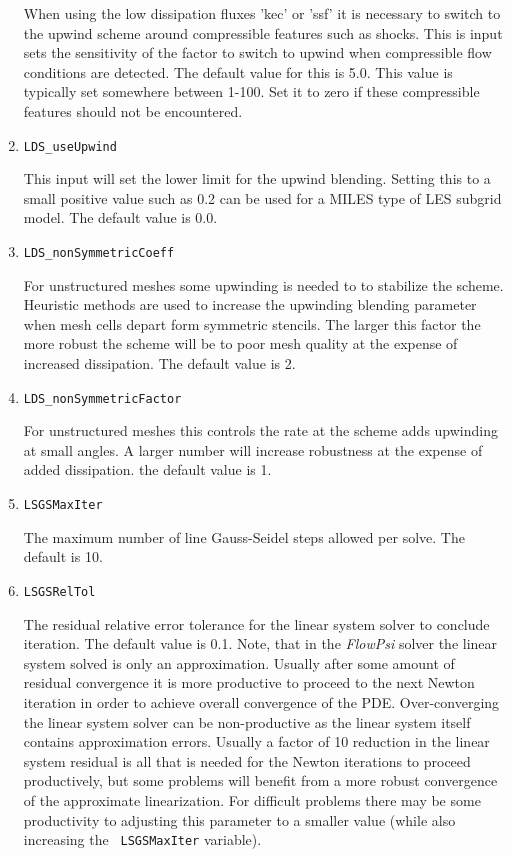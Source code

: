 \documentclass{article}
\begin{document}
\begin{enumerate}
  When using the low dissipation fluxes 'kec' or 'ssf' it is necessary
  to switch to the upwind scheme around compressible features such as
  shocks.  This is input sets the sensitivity of the factor to switch
  to upwind when compressible flow conditions are detected.  The
  default value for this is 5.0.  This value is typically set
  somewhere between 1-100.  Set it to zero if these compressible
  features should not be encountered.

\item {\tt LDS\_useUpwind}

  This input will set the lower limit for the upwind blending.
  Setting this to a small positive value such as 0.2 can be used for a
  MILES type of LES subgrid model.  The default value is 0.0.

\item {\tt LDS\_nonSymmetricCoeff}

  For unstructured meshes some upwinding is needed to to stabilize the
  scheme.  Heuristic methods are used to increase the upwinding
  blending parameter when mesh cells depart form symmetric stencils.
  The larger this factor the more robust the scheme will be to poor
  mesh quality at the expense of increased dissipation. The default
  value is 2.

\item {\tt LDS\_nonSymmetricFactor}

  For unstructured meshes this controls the rate at the scheme adds
  upwinding at small angles.  A larger number will increase robustness
  at the expense of added dissipation.  the default value is 1.

\item {\tt LSGSMaxIter} 

  The maximum number of line Gauss-Seidel steps
  allowed per solve. The default is 10.

\item {\tt LSGSRelTol} 

  The residual relative error tolerance for the linear system solver
  to conclude iteration.  The default value is 0.1.  Note, that in the
  {\em FlowPsi} solver the linear system solved is only an approximation.
  Usually after some amount of residual convergence it is more
  productive to proceed to the next Newton iteration in order to
  achieve overall convergence of the PDE.  Over-converging the linear
  system solver can be non-productive as the linear system itself
  contains approximation errors.  Usually a factor of 10 reduction in
  the linear system residual is all that is needed for the Newton
  iterations to proceed productively, but some problems will benefit
  from a more robust convergence of the approximate linearization.
  For difficult problems there may be some productivity to adjusting
  this parameter to a smaller value (while also increasing the {\tt
    LSGSMaxIter} variable).


\end{enumerate}
\end{document}
